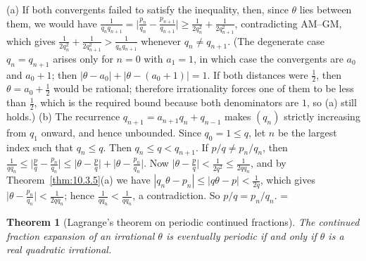 \documentclass[11pt]{article}
\makeatletter
\theoremstyle{ntstyle}
\newtheorem{theorem}{Theorem}[subsection]
\let\nt@closedisplay\]
\def\nt@guardedclose{\@ifnextchar\par{\nt@closeafterpar}{\@ifnextchar\end{\postdisplaypenalty\@M\nt@closedisplay}{\nt@closedisplay}}}
\def\nt@closeafterpar\par{\@ifnextchar\par{\nt@closeafterpar}{\@ifnextchar\end{\postdisplaypenalty\@M\nt@closedisplay\par}{\nt@closedisplay\par}}}
\renewenvironment{proof}[1][\proofname]{\par
  \pushQED{\qed}\normalfont\topsep\medskipamount\edef\nt@afterproof{\@endparpenalty=\the\@endparpenalty\relax}\@beginparpenalty\@M\@endparpenalty\@M\let\]\nt@guardedclose\trivlist\item[]\textit{#1\@addpunct{.}} \ignorespaces}{\ifvmode\addpenalty\@M\fi\popQED\nt@afterproof\endtrivlist\@endpefalse}
\makeatother
\begin{document}
\begin{proof} (a) If both convergents failed to satisfy the inequality, then, since
	$\theta$ lies between them, we would have
	$\tfrac{1}{q_nq_{n+1}}=\big|\tfrac{p_n}{q_n}-\tfrac{p_{n+1}}{q_{n+1}}\big|\ge\tfrac{1}{2q_n^2}+\tfrac{1}{2q_{n+1}^2}$,
	contradicting AM--GM, which gives
	$\tfrac{1}{2q_n^2}+\tfrac{1}{2q_{n+1}^2}>\tfrac{1}{q_nq_{n+1}}$ whenever
	$q_n\neq q_{n+1}$. (The degenerate case $q_n=q_{n+1}$ arises only for
	$n=0$ with $a_1=1$, in which case the convergents are $a_0$ and $a_0+1$; then
	$|\theta-a_0|+|\theta-(a_0+1)|=1$. If both distances were
	$\tfrac{1}{2}$, then $\theta=a_0+\tfrac{1}{2}$ would be rational;
	therefore irrationality forces one of them to be
	less than $\tfrac{1}{2}$, which is the required bound because both denominators
	are $1$, so (a) still holds.) (b) The recurrence $q_{n+1}=a_{n+1}q_n+q_{n-1}$ makes $(q_n)$
	strictly increasing from $q_1$ onward, and hence unbounded.
	Since $q_0=1\le q$, let $n$ be the largest index such that $q_n\le q$.
	Then $q_n\le q<q_{n+1}$. If $p/q\neq p_n/q_n$, then
	$\tfrac{1}{qq_n}\le\big|\tfrac{p}{q}-\tfrac{p_n}{q_n}\big|\le\big|\theta-\tfrac{p}{q}\big|+\big|\theta-\tfrac{p_n}{q_n}\big|$. Now $\big|\theta-\tfrac{p}{q}\big|<\tfrac{1}{2q^2}\le\tfrac{1}{2qq_n}$, and by Theorem~\ref{thm:10.3.5}(a) we have
	$|q_n\theta-p_n|\le|q\theta-p|<\tfrac{1}{2q}$, which gives
	$\big|\theta-\tfrac{p_n}{q_n}\big|<\tfrac{1}{2qq_n}$; hence
	$\tfrac{1}{qq_n}<\tfrac{1}{qq_n}$, a contradiction. So $p/q=p_n/q_n$.
\end{proof}
\begin{theorem}[Lagrange's theorem on periodic continued fractions]\label{thm:10.3.7} The continued fraction expansion of an irrational
	$\theta$ is eventually periodic if and only if $\theta$ is a real
	quadratic irrational.
\end{theorem}
\end{document}
